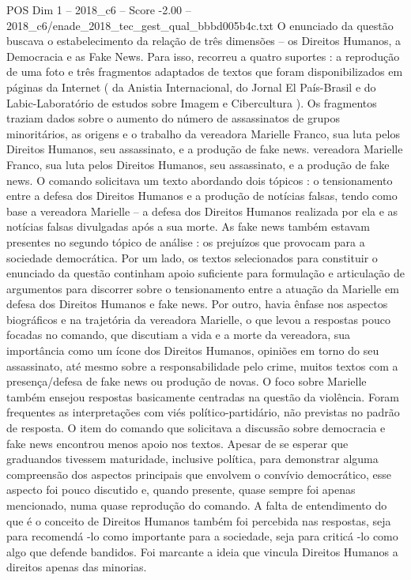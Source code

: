 \begin{textsample}{POS Dim 1 – 2018\_c6 – Score -2.00 – 2018\_c6/enade\_2018\_tec\_gest\_qual\_bbbd005b4c.txt}
O enunciado da questão buscava o estabelecimento da relação de três dimensões – os Direitos Humanos, a Democracia e as Fake News.
Para isso, recorreu a quatro suportes : a reprodução de uma foto e três fragmentos adaptados de textos que foram disponibilizados em páginas da Internet ( da Anistia Internacional, do Jornal El País-Brasil e do Labic-Laboratório de estudos sobre Imagem e Cibercultura ).
Os fragmentos traziam dados sobre o aumento do número de assassinatos de grupos minoritários, as origens e o trabalho da vereadora Marielle Franco, sua luta pelos Direitos Humanos, seu assassinato, e a produção de fake news. vereadora Marielle Franco, sua luta pelos Direitos Humanos, seu assassinato, e a produção de fake news.
O comando solicitava um texto abordando dois tópicos : o tensionamento entre a defesa dos Direitos Humanos e a produção de notícias falsas, tendo como base a vereadora Marielle – a defesa dos Direitos Humanos realizada por ela e as notícias falsas divulgadas após a sua morte.
As fake news também estavam presentes no segundo tópico de análise : os prejuízos que provocam para a sociedade democrática.
Por um lado, os textos selecionados para constituir o enunciado da questão continham apoio suficiente para formulação e articulação de argumentos para discorrer sobre o tensionamento entre a atuação da Marielle em defesa dos Direitos Humanos e fake news.
Por outro, havia ênfase nos aspectos biográficos e na trajetória da vereadora Marielle, o que levou a respostas pouco focadas no comando, que discutiam a vida e a morte da vereadora, sua importância como um ícone dos Direitos Humanos, opiniões em torno do seu assassinato, até mesmo sobre a responsabilidade pelo crime, muitos textos com a presença/defesa de fake news ou produção de novas.
O foco sobre Marielle também ensejou respostas basicamente centradas na questão da violência.
Foram frequentes as interpretações com viés político-partidário, não previstas no padrão de resposta.
O item do comando que solicitava a discussão sobre democracia e fake news encontrou menos apoio nos textos.
Apesar de se esperar que graduandos tivessem maturidade, inclusive política, para demonstrar alguma compreensão dos aspectos principais que envolvem o convívio democrático, esse aspecto foi pouco discutido e, quando presente, quase sempre foi apenas mencionado, numa quase reprodução do comando.
A falta de entendimento do que é o conceito de Direitos Humanos também foi percebida nas respostas, seja para recomendá -lo como importante para a sociedade, seja para criticá -lo como algo que defende bandidos.
Foi marcante a ideia que vincula Direitos Humanos a direitos apenas das minorias.

\end{textsample}
